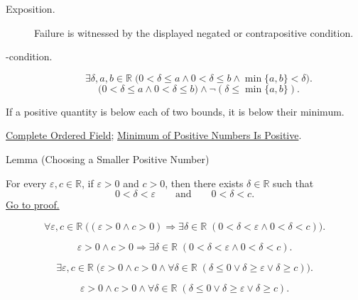 \begin{remark*}
\begin{description}
  \item[Exposition.]
  Failure is witnessed by the displayed negated or contrapositive condition.

  \item[\exists-condition.]
  \[
\exists \delta,a,b\in\mathbb{R}\;
\bigl(0<\delta\leq a\land 0<\delta\leq b\land \min\{a,b\}<\delta\bigr).
\]
\[
\bigl(0<\delta\leq a\land 0<\delta\leq b\bigr)\land
\neg(\delta\leq\min\{a,b\}).
\]
\end{description}
\end{remark*}
\begin{remark*}[Interpretation]
If a positive quantity is below each of two bounds, it is below their minimum.
\end{remark*}
\begin{dependencies}
\hyperref[def:real-ordered-field]{Complete Ordered Field};
\hyperref[lem:minimum-of-positive-numbers-is-positive]{Minimum of Positive Numbers Is Positive}.
\end{dependencies}

\begin{lemmabox}{Lemma (Choosing a Smaller Positive Number)}
\begin{lemma}
\label{lem:choosing-a-smaller-positive-number}
For every $\varepsilon,c\in\mathbb{R}$, if $\varepsilon>0$ and $c>0$, then
there exists $\delta\in\mathbb{R}$ such that
\[
  0<\delta<\varepsilon
  \qquad\text{and}\qquad
  0<\delta<c.
\]
\hyperref[prf:choosing-a-smaller-positive-number]{Go to proof.}
\end{lemma}
\end{lemmabox}
\begin{remark*}
\[
\forall \varepsilon,c\in\mathbb{R}\;
\bigl((\varepsilon>0\land c>0)\Longrightarrow
\exists\delta\in\mathbb{R}\;(0<\delta<\varepsilon\land 0<\delta<c)\bigr).
\]
\end{remark*}
\begin{remark*}
\[
\varepsilon>0\land c>0
\Longrightarrow
\exists\delta\in\mathbb{R}\;(0<\delta<\varepsilon\land 0<\delta<c).
\]
\end{remark*}
\begin{remark*}
\[
\exists \varepsilon,c\in\mathbb{R}\;
\bigl(\varepsilon>0\land c>0\land
\forall\delta\in\mathbb{R}\;(\delta\leq 0\lor \delta\geq\varepsilon\lor \delta\geq c)\bigr).
\]
\end{remark*}
\begin{remark*}
\[
\varepsilon>0\land c>0\land
\forall\delta\in\mathbb{R}\;(\delta\leq 0\lor \delta\geq\varepsilon\lor \delta\geq c).
\]
\end{remark*}

